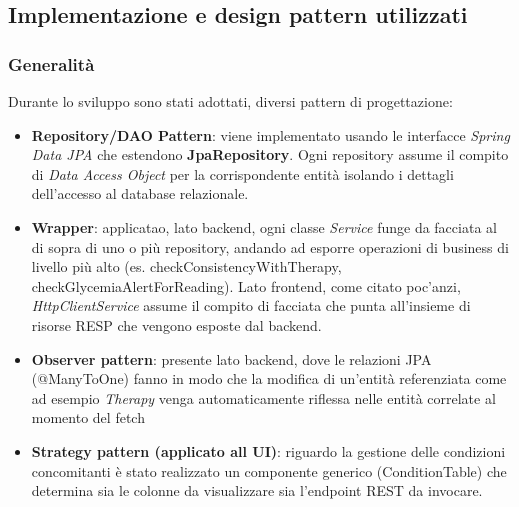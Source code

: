 \documentclass{article}
\begin{document}
\subsection{Implementazione e design pattern utilizzati}
\subsubsection{Generalità}
Durante lo sviluppo sono stati adottati, diversi pattern di progettazione:
\begin{itemize}
   \item \textbf{Repository/DAO Pattern}: viene implementato usando le interfacce \textit{Spring Data JPA} che estendono \textbf{JpaRepository}.
       Ogni repository assume il compito di \textit{Data Access Object} per la corrispondente entità
       isolando i dettagli dell'accesso al database relazionale.
   \item \textbf{Wrapper}: applicatao, lato backend, ogni classe \textit{Service} funge da facciata al di sopra di uno o più repository, andando ad esporre
       operazioni di business di livello più alto (es. checkConsistencyWithTherapy, checkGlycemiaAlertForReading). Lato frontend, come citato poc'anzi, \textit{HttpClientService}
       assume il compito di facciata che punta all'insieme di risorse RESP che vengono esposte dal backend.
   \item \textbf{Observer pattern}: presente lato backend, dove le relazioni JPA (@ManyToOne) fanno in modo che la modifica di un'entità referenziata
       come ad esempio \textit{Therapy} venga automaticamente riflessa nelle entità correlate al momento del fetch
   \item \textbf{Strategy pattern (applicato all UI)}: riguardo la gestione delle condizioni concomitanti è stato realizzato un componente generico (ConditionTable)
       che determina sia le colonne da visualizzare sia l'endpoint REST da invocare.
\end{itemize}
\end{document}
